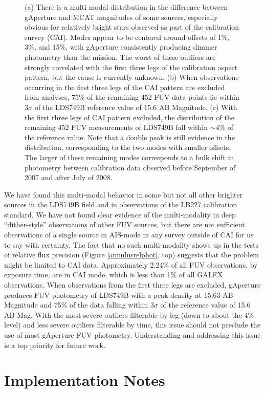 \documentclass[preprint]{aastex}
\begin{document}
\begin{figure}[h]
\caption{(a) There is a multi-modal distribution in the difference between gAperture and MCAT magnitudes of some sources, especially obvious for relatively bright stars observed as part of the calibration survey (CAI). Modes appear to be centered around offsets of 1\%, 3\%, and 15\%, with gAperture consistently producing dimmer photometry than the mission. The worst of these outliers are strongly correlated with the first three legs of the calibration aspect pattern, but the cause is currently unknown. (b) When observations occurring in the first three legs of the CAI pattern are excluded from analyses, 75\% of the remaining 452 FUV data points lie within 3$\sigma$ of the LDS749B reference value of 15.6 AB Magnitude. (c) With the first three legs of CAI pattern excluded, the distribution of the remaining 452 FUV measurements of LDS749B fall within $\sim4\%$ of the reference value. Note that a double peak is still evidence in the distribution, corresponding to the two modes with smaller offsets. The larger of these remaining modes corresponds to a bulk shift in photometry between calibration data observed before September of 2007 and after July of 2008.
\label{multimodal}}
\end{figure}
\clearpage

We have found this multi-modal behavior in some but not all other brighter sources in the LDS749B field and in observations of the LB227 calibration standard. We have not found clear evidence of the multi-modality in deep ``dither-style'' observations of other FUV sources, but there are not sufficient observations of a single source in AIS-mode in any survey outside of CAI for us to say with certainty. The fact that no such multi-modality shows up in the tests of relative flux precision (Figure \ref{annulusrelphot}, top) suggests that the problem might be limited to CAI data. Approximately 2.24\% of all FUV observations, by exposure time, are in CAI mode, which is less than 1\% of all GALEX observations. When observations from the first three legs are excluded, gAperture produces FUV photometry of LDS749B with a peak density at 15.63 AB Magnitude and 75\% of the data falling within 3$\sigma$ of the reference value of 15.6 AB Mag. With the most severe outliers filterable by leg (down to about the $4$\% level) and less severe outliers filterable by time, this issue should not preclude the use of most gAperture FUV photometry. Understanding and addressing this issue is a top priority for future work.

\section{Implementation Notes}
\label{implementation}
\end{document}
